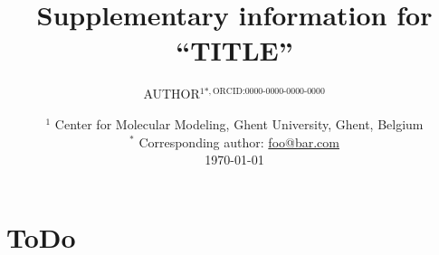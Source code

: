 \documentclass[11pt]{article}
\title{Supplementary information for ``TITLE''}
\author{%
    AUTHOR$^{1*, \text{ORCID:0000-0000-0000-0000}}$\\
}
\date{%
    $^1$ Center for Molecular Modeling, Ghent University, Ghent, Belgium\\
    $^*$ Corresponding author: \url{foo@bar.com}\\\bigskip
    \today
}
\begin{document}
\maketitle
{}
\tableofcontents
\appendix

\newpage
{}

\section{ToDo}
\label{sec:todo}
\end{document}
